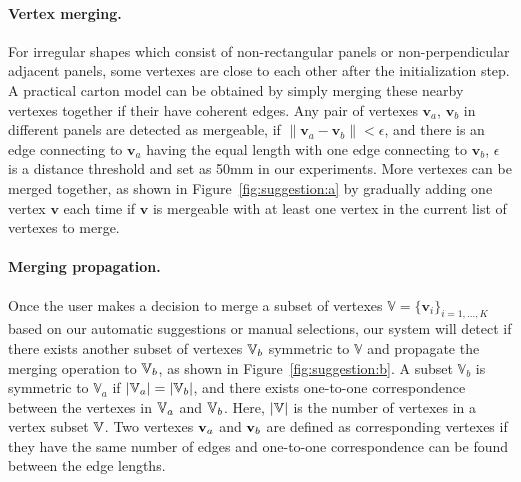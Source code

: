 \paragraph{Vertex merging.} 
For irregular shapes which consist of non-rectangular panels or non-perpendicular adjacent panels, some vertexes are close to each other after the initialization step.
A practical carton model can be obtained by simply merging these nearby vertexes together if their have coherent edges.
%
Any pair of vertexes $\mathbf{v}_a$, $\mathbf{v}_b$ in different panels are detected as mergeable, if $\|\mathbf{v}_a-\mathbf{v}_b\|<\epsilon$, and there is an edge connecting to $\mathbf{v}_a$ having the equal length with one edge connecting to $\mathbf{v}_b$,
%
$\epsilon$ is a distance threshold and set as 50mm in our experiments.
More vertexes can be merged together, as shown in Figure~\ref{fig:suggestion:a} by gradually adding one vertex $\mathbf{v}$ each time if $\mathbf{v}$ is mergeable with at least one vertex in the current list of vertexes to merge. 

\paragraph{Merging propagation.} %
Once the user makes a decision to merge a subset of vertexes $\mathbb{V}=\{\mathbf{v}_i\}_{i=1,\ldots,K}$ based on our automatic suggestions or manual selections, our system will detect if there exists another subset of vertexes $\mathbb{V}_b$ symmetric to $\mathbb{V}$ and propagate the merging operation to $\mathbb{V}_b$, as shown in Figure~\ref{fig:suggestion:b}. 
A subset $\mathbb{V}_b$ is symmetric to $\mathbb{V}_a$ if $|\mathbb{V}_a|=|\mathbb{V}_b|$, and there exists one-to-one correspondence between the vertexes in $\mathbb{V}_a$ and $\mathbb{V}_b$. 
Here, $|\mathbb{V}|$ is the number of vertexes in a vertex subset $\mathbb{V}$. 
Two vertexes $\mathbf{v}_a$ and $\mathbf{v}_b$ are defined as corresponding vertexes if they have the same number of edges and one-to-one correspondence can be found between the edge lengths. 


